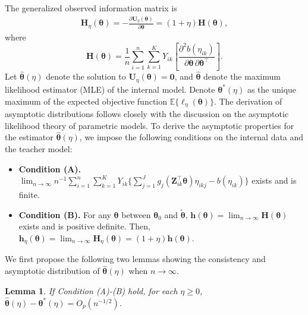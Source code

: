 \documentclass{article}
\theoremstyle{plain}
\newtheorem{lemma}[theorem]{Lemma}
\theoremstyle{definition}
\theoremstyle{remark}
\begin{document}
The generalized observed information matrix is
\begin{eqnarray*}
\boldsymbol{H}_\eta(\boldsymbol{\theta})=-\frac{\partial \boldsymbol{U}_\eta(\boldsymbol{\theta})}{\partial \boldsymbol{\theta}}
= (1+ \eta)\boldsymbol{H}(\boldsymbol{\theta}),
\end{eqnarray*}
where
\begin{equation*}
\boldsymbol{H}(\boldsymbol{\theta})
= \frac{1}{n} \sum_{i=1}^n\sum_{k=1}^{K} Y_{ik}
\left[
\frac{\partial^2 b(\eta_{ik})}{\partial \boldsymbol{\theta}\,\partial \boldsymbol{\theta}^\top}
\right].
\end{equation*}
Let  $\hat{\boldsymbol{\theta}}(\eta)$ denote the solution to $\boldsymbol{U}_\eta(\boldsymbol{\theta})=\boldsymbol{0}$, and  $\hat{\boldsymbol{\theta}}$ denote the maximum likelihood estimator (MLE) of the internal model. 
Denote $\boldsymbol{\theta}^{*}(\eta)$ as the unique maximum of the expected objective function $\mathbb{E}\{\ell_{\eta}(\boldsymbol{\theta})\}$. The derivation of asymptotic distributions follows closely with the discussion on the asymptotic likelihood theory of parametric models.
To derive the asymptotic properties for the  estimator $\hat{\boldsymbol{\theta}}(\eta)$, 
we impose the following conditions on the internal data and the teacher model:

\begin{itemize}
\item \textbf{Condition (A).} $\lim_{n \rightarrow \infty}n^{-1}\sum_{i=1}^{n}\sum_{k=1}^{K}Y
_{ik}
\{\sum_{j=1}^J g_j(\boldsymbol{Z}_{ik}^\top\boldsymbol{\theta})\eta_{ikj}-b(\eta_{ik})\}$ exists and is finite.

\item \textbf{Condition (B).} For any $\boldsymbol{\theta}$ between $\boldsymbol{\theta}_{0}$ and $\tilde{\boldsymbol{\theta}}$, $\boldsymbol{h}(\boldsymbol{\theta})=\lim_{n \rightarrow \infty} \boldsymbol{H}(\boldsymbol{\theta})$ exists and is positive definite. Then, $\boldsymbol{h}_\eta(\boldsymbol{\theta})=\lim_{n \rightarrow \infty} \boldsymbol{H}_{\eta}(\boldsymbol{\theta})=(1+\eta)\boldsymbol{h}(\boldsymbol{\theta})$.
\end{itemize}
We first propose the following two lemmas showing the consistency and asymptotic distribution of $\hat{\boldsymbol{\theta}}(\eta)$ when $n \rightarrow \infty$. 

\begin{lemma}\label{le1}
If Condition (A)-(B) hold, for each $\eta\geq 0$, $\hat{\boldsymbol{\theta}}(\eta)-\boldsymbol{\theta}^*(\eta)=O_p(n^{-1/2})$.
\end{lemma}
\end{document}
